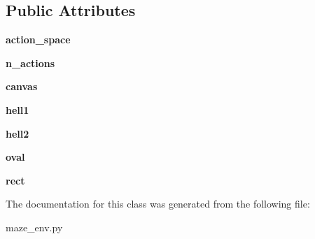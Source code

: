\subsection*{Public Attributes}
\begin{DoxyCompactItemize}
\item 
\mbox{\label{classmaze__env_1_1Maze_ac5fc18b9882a01efe011ffc7b078dac9}} 
{\bfseries action\+\_\+space}
\item 
\mbox{\label{classmaze__env_1_1Maze_ab5b2f224be879eb3e0df0c071dbf2717}} 
{\bfseries n\+\_\+actions}
\item 
\mbox{\label{classmaze__env_1_1Maze_a3ec394d4f9614ebb7f194ad96af8209a}} 
{\bfseries canvas}
\item 
\mbox{\label{classmaze__env_1_1Maze_a763715893172c4c2709dc7bc9f24fae6}} 
{\bfseries hell1}
\item 
\mbox{\label{classmaze__env_1_1Maze_aba259d09fef945840ec1285bccc3575c}} 
{\bfseries hell2}
\item 
\mbox{\label{classmaze__env_1_1Maze_abcd207aa0ef78431357bc669dad5a203}} 
{\bfseries oval}
\item 
\mbox{\label{classmaze__env_1_1Maze_a092173c5f826143df09bb4861fd6ea57}} 
{\bfseries rect}
\end{DoxyCompactItemize}


The documentation for this class was generated from the following file\+:\begin{DoxyCompactItemize}
\item 
maze\+\_\+env.\+py\end{DoxyCompactItemize}
